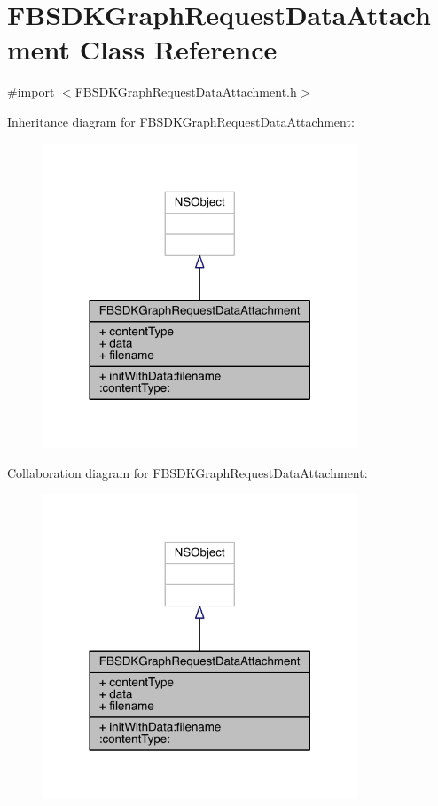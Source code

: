 \hypertarget{interface_f_b_s_d_k_graph_request_data_attachment}{\section{F\-B\-S\-D\-K\-Graph\-Request\-Data\-Attachment Class Reference}
\label{interface_f_b_s_d_k_graph_request_data_attachment}
}


{\ttfamily \#import $<$F\-B\-S\-D\-K\-Graph\-Request\-Data\-Attachment.\-h$>$}



Inheritance diagram for F\-B\-S\-D\-K\-Graph\-Request\-Data\-Attachment\-:
\nopagebreak
\begin{figure}[H]
\begin{center}
\leavevmode
\includegraphics[width=266pt]{interface_f_b_s_d_k_graph_request_data_attachment__inherit__graph}
\end{center}
\end{figure}


Collaboration diagram for F\-B\-S\-D\-K\-Graph\-Request\-Data\-Attachment\-:
\nopagebreak
\begin{figure}[H]
\begin{center}
\leavevmode
\includegraphics[width=266pt]{interface_f_b_s_d_k_graph_request_data_attachment__coll__graph}
\end{center}
\end{figure}
